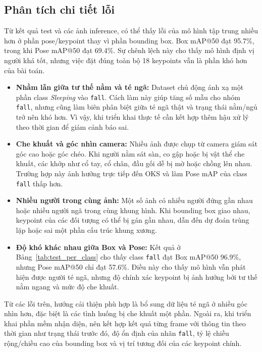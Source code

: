 \documentclass[12pt, a4paper]{article}
\begin{document}
\subsection{Phân tích chi tiết lỗi}
\label{subsec:error_analysis}
Từ kết quả test và các ảnh inference, có thể thấy lỗi của mô hình tập trung nhiều hơn ở phần pose/keypoint thay vì phần bounding box.
Box mAP@50 đạt 95.7\%, trong khi Pose mAP@50 đạt 69.4\%.
Sự chênh lệch này cho thấy mô hình định vị người khá tốt, nhưng việc đặt đúng toàn bộ 18 keypoints vẫn là phần khó hơn của bài toán.

\begin{itemize}
    \item \textbf{Nhầm lẫn giữa tư thế nằm và té ngã:} Dataset chủ động ánh xạ một phần class \textit{Sleeping} vào \texttt{fall}. Cách làm này giúp tăng số mẫu cho nhóm \texttt{fall}, nhưng cũng làm biên phân biệt giữa té ngã thật và trạng thái nằm/ngủ trở nên khó hơn. Vì vậy, khi triển khai thực tế cần kết hợp thêm hậu xử lý theo thời gian để giảm cảnh báo sai.
    \item \textbf{Che khuất và góc nhìn camera:} Nhiều ảnh được chụp từ camera giám sát góc cao hoặc góc chéo. Khi người nằm sát sàn, co gập hoặc bị vật thể che khuất, các khớp như cổ tay, cổ chân, đầu gối dễ bị mờ hoặc chồng lên nhau. Trường hợp này ảnh hưởng trực tiếp đến OKS và làm Pose mAP của class \texttt{fall} thấp hơn.
    \item \textbf{Nhiều người trong cùng ảnh:} Một số ảnh có nhiều người đứng gần nhau hoặc nhiều người ngã trong cùng khung hình. Khi bounding box giao nhau, keypoint của các đối tượng có thể bị gán gần nhau, dẫn đến dự đoán trùng lặp hoặc sai một phần cấu trúc khung xương.
    \item \textbf{Độ khó khác nhau giữa Box và Pose:} Kết quả ở Bảng~\ref{tab:test_per_class} cho thấy class \texttt{fall} đạt Box mAP@50 96.9\%, nhưng Pose mAP@50 chỉ đạt 57.6\%. Điều này cho thấy mô hình vẫn phát hiện được người té ngã, nhưng độ chính xác keypoint bị ảnh hưởng bởi tư thế nằm ngang và mức độ che khuất.
\end{itemize}

Từ các lỗi trên, hướng cải thiện phù hợp là bổ sung dữ liệu té ngã ở nhiều góc nhìn hơn, đặc biệt là các tình huống bị che khuất một phần.
Ngoài ra, khi triển khai phần mềm nhận diện, nên kết hợp kết quả từng frame với thông tin theo thời gian như trạng thái trước đó, độ ổn định của nhãn \texttt{fall}, tỷ lệ chiều rộng/chiều cao của bounding box và vị trí tương đối của các keypoint chính.
\end{document}
